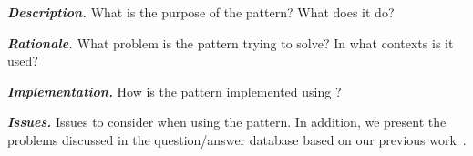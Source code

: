 {

\noindent \textbf{\em Description.}
{What is the purpose of the pattern? What does it do?}

\noindent \textbf{\em Rationale.}
{What problem is the pattern trying to solve? In what contexts is it used?}


\noindent \textbf{\em Implementation.}
{How is the pattern implemented using \smu{}?}




\noindent \textbf{\em Issues.}
{Issues to consider when using the pattern.
In addition, we present the problems discussed in the
\stackoverflow{} question/answer database based on our previous work~\citep{mastrangeloUseYourOwn2015}.}



}



